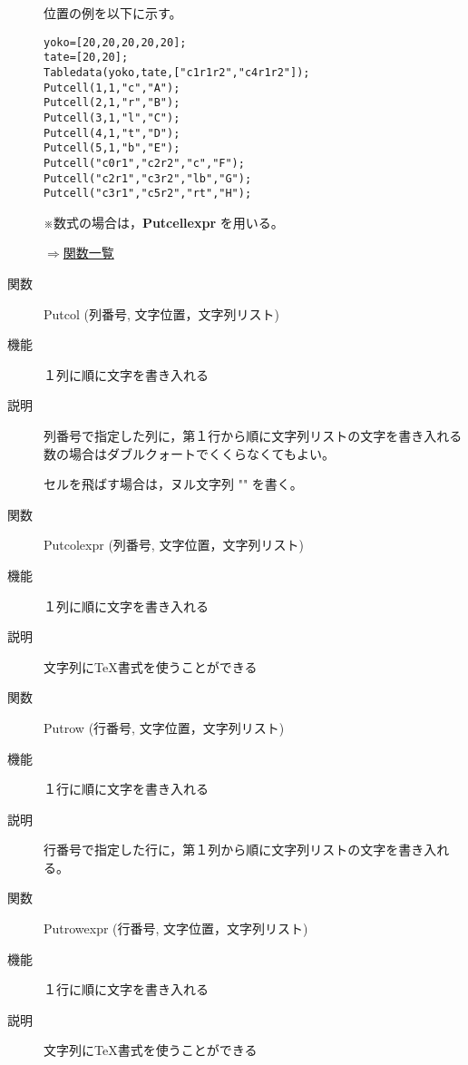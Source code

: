 \documentclass[papersize,a4paper,10pt,uplatex]{jsarticle}
\begin{document}
\begin{description}
位置の例を以下に示す。
\begin{verbatim}
yoko=[20,20,20,20,20];
tate=[20,20];
Tabledata(yoko,tate,["c1r1r2","c4r1r2"]);
Putcell(1,1,"c","A");
Putcell(2,1,"r","B");
Putcell(3,1,"l","C");
Putcell(4,1,"t","D");
Putcell(5,1,"b","E");
Putcell("c0r1","c2r2","c","F");
Putcell("c2r1","c3r2","lb","G");
Putcell("c3r1","c5r2","rt","H");
\end{verbatim}
\vspace{\baselineskip}
\begin{center}  \end{center}

※数式の場合は，{\bf Putcellexpr} を用いる。

\begin{flushright}\hyperlink{functionlist}{$\Rightarrow$関数一覧}\end{flushright}

\vspace{\baselineskip}
\hypertarget{putcol}{}
\item[関数]Putcol (列番号, 文字位置，文字列リスト)
\item[機能]１列に順に文字を書き入れる
\item[説明]列番号で指定した列に，第１行から順に文字列リストの文字を書き入れる\\
数の場合はダブルクォートでくくらなくてもよい。

セルを飛ばす場合は，ヌル文字列 "" を書く。

\vspace{\baselineskip}
\hypertarget{putcolexpr}{}
\item[関数]Putcolexpr (列番号, 文字位置，文字列リスト)
\item[機能]１列に順に文字を書き入れる
\item[説明]文字列に\TeX 書式を使うことができる

\vspace{\baselineskip}
\hypertarget{putrow}{}
\item[関数]Putrow (行番号, 文字位置，文字列リスト)
\item[機能]１行に順に文字を書き入れる
\item[説明]行番号で指定した行に，第１列から順に文字列リストの文字を書き入れる。


\vspace{\baselineskip}
\hypertarget{putrowexpr}{}
\item[関数]Putrowexpr (行番号, 文字位置，文字列リスト)
\item[機能]１行に順に文字を書き入れる
\item[説明]文字列に\TeX 書式を使うことができる


\end{description}
\end{document}
